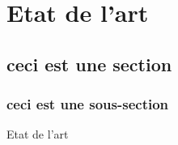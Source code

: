 \chapter{Etat de l'art}
\section{ceci est une section}
\subsection{ceci est une sous-section}

Etat de l'art